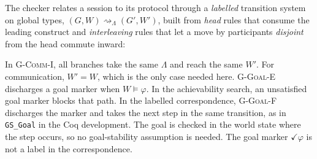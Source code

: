 \documentclass{article}
\theoremstyle{plain}
\theoremstyle{definition}
\newcommand{\reach}{\rightsquigarrow}
\newcommand{\id}[1]{\texttt{#1}}
\newcommand{\cp}[1]{\mathsf{cap}(#1)}
\newcommand{\prt}[1]{\mathsf{prt}(#1)}
\newcommand{\set}[1]{\{#1\}}
\def \bgc {}
\def \egc {}
\begin{document}
The checker relates a session to its protocol through a \emph{labelled} transition
system on global types, $(G,W)\reach_{\!\Lambda}(G',W')$, built from \emph{head}
rules that consume the leading construct and \emph{interleaving} rules that let a
move by participants \emph{disjoint} from the head commute inward:
\bgc In \textsc{G-Comm-I}, all branches take the same $\Lambda$ and reach the
same $W'$. For communication, $W'=W$, which is the only case needed here.
\textsc{G-Goal-E} discharges a goal marker when $W\vDash\varphi$. In the
achievability search, an unsatisfied goal marker blocks that path. In the
labelled correspondence, \textsc{G-Goal-F} discharges the marker and takes the
next step in the same transition, as in \id{GS\_Goal} in the Coq development.
The goal is checked in the world state where the step occurs, so no
goal-stability assumption is needed. The goal marker $\checkmark\varphi$ is
not a label in the correspondence.\egc
\end{document}
